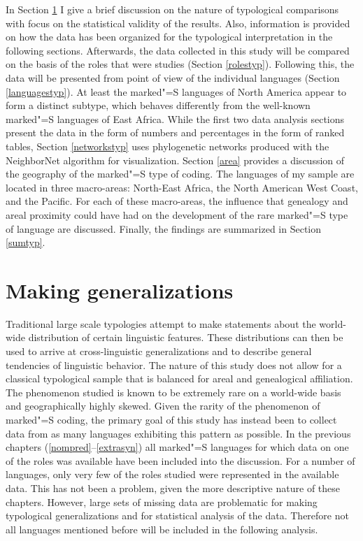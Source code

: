 In Section \ref{general} I give a brief discussion on the nature of typological comparisons with focus on the statistical validity of the results.
Also, information is provided on how the data has been organized for the typological interpretation in the following sections.
Afterwards, the data collected in this study will be compared on the basis of the roles that were studies (Section \ref{rolestyp}). 
Following this, the data will be presented from point of view of the individual languages (Section \ref{languagestyp}). 
At least the marked"=S languages of North America appear to form a distinct subtype, which behaves differently from the well-known marked"=S languages of East Africa. 
While the first two data analysis sections present the data in the form of numbers and percentages in the form of ranked tables, Section \ref{networkstyp} uses phylogenetic networks produced with the NeighborNet algorithm \citep{NeighborNet} for visualization.
Section \ref{area} provides a discussion of the geography of the marked"=S type of coding. 
The languages of my sample are located in three macro-areas: North-East Africa, the North American West Coast, and the Pacific. 
For each of these macro-areas, the influence that genealogy and areal proximity could have had on the development of the rare marked"=S type of language are discussed.
Finally, the findings are summarized in Section \ref{sumtyp}.
     

\section{Making generalizations}\label{general}

Traditional large scale typologies attempt to make statements about the world-wide distribution of certain linguistic features.
These distributions can then be used to arrive at cross-linguistic generalizations and to describe general tendencies of linguistic behavior.
The nature of this study  does not allow for a classical typological sample that is balanced for areal and genealogical affiliation. 
The phenomenon studied is known to be extremely rare on a world-wide basis and geographically highly skewed.
Given the rarity of the phenomenon of marked"=S coding, the primary goal of this study has instead been to collect data from as many languages exhibiting this pattern as possible. 
In the previous chapters (\ref{nompred}--\ref{extrasyn}) all marked"=S languages for which data on one of the roles was available have been included into the discussion. 
For a number of languages, only very few of the roles studied were represented in the available data. 
This has not been a problem, given the more descriptive nature of these chapters. 
However, large sets of missing data are problematic for making typological generalizations and for statistical analysis of the data. 
Therefore not all languages mentioned before will be included in the following analysis. 

